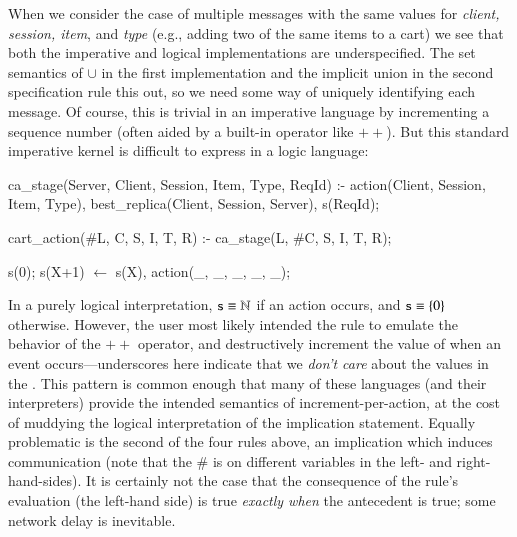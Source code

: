 

When we consider the case of multiple messages with the same values for
{\em client, session, item}, and {\em type} (e.g., adding two of the same items to a cart)
we see that both the imperative and logical implementations are underspecified.
The set semantics of $\cup$ in the first implementation and the implicit union 
in the second specification rule this out, so we need some way of uniquely identifying each message.
Of course, this is trivial in an imperative language by incrementing a sequence number (often aided by a built-in operator like $++$).
But this standard imperative kernel is difficult to express in a logic language:

\begin{Dedalus}
ca_stage(Server, Client, Session, Item, Type, ReqId) :-
  action(Client, Session, Item, Type),
  best_replica(Client, Session, Server),
  s(ReqId);

cart_action(#L, C, S, I, T, R) :-
  ca_stage(L, #C, S, I, T, R);

s(0);
s(X+1) \(\leftarrow\)  s(X), action(_, _, _, _, _);
\end{Dedalus}

In a purely logical interpretation, $\dedalus{s} \equiv \mathbb{N}$ if an
action occurs, and $\dedalus{s} \equiv \{0\}$ otherwise.  However,
the user most likely intended the  rule to emulate the behavior of
the $++$ operator, and destructively increment the value of  when
an  event occurs---underscores here indicate that we {\em don't care} about the values in the .
This pattern is common enough
that many of these languages (and their interpreters) provide the intended semantics of increment-per-action, at the cost of muddying the logical
interpretation of the implication statement.  Equally problematic is the second of the four rules above,
an implication which induces communication (note that the \# is on different variables in the left- and right-hand-sides).  It is certainly not the case that the consequence of the rule's evaluation (the left-hand side) is true {\em exactly when}  the antecedent is true; some network delay is inevitable.

